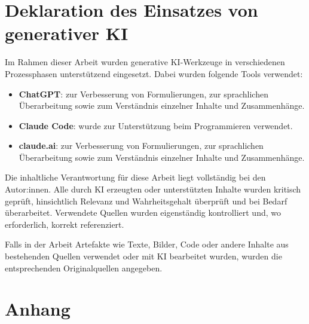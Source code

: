 \documentclass[11pt,a4paper]{article}
\newcounter{includepdfpage}
\begin{document}
	\section*{Deklaration des Einsatzes von generativer KI}
	\begin{minipage}[t]{\textwidth}
		Im Rahmen dieser Arbeit wurden generative KI-Werkzeuge in verschiedenen Prozessphasen unterstützend eingesetzt. Dabei wurden folgende Tools verwendet:
		
		\begin{itemize}
			\item \textbf{ChatGPT}: zur Verbesserung von Formulierungen, zur sprachlichen Überarbeitung sowie zum Verständnis einzelner Inhalte und Zusammenhänge.
			\item \textbf{Claude Code}: wurde zur Unterstützung beim Programmieren verwendet.
			\item \textbf{claude.ai}: zur Verbesserung von Formulierungen, zur sprachlichen Überarbeitung sowie zum Verständnis einzelner Inhalte und Zusammenhänge.
		\end{itemize}
		
		Die inhaltliche Verantwortung für diese Arbeit liegt vollständig bei den Autor:innen. Alle durch KI erzeugten oder unterstützten Inhalte wurden kritisch geprüft, hinsichtlich Relevanz und Wahrheitsgehalt überprüft und bei Bedarf überarbeitet. Verwendete Quellen wurden eigenständig kontrolliert und, wo erforderlich, korrekt referenziert.
		
		Falls in der Arbeit Artefakte wie Texte, Bilder, Code oder andere Inhalte aus bestehenden Quellen verwendet oder mit KI bearbeitet wurden, wurden die entsprechenden Originalquellen angegeben.
	\end{minipage}
	
	
	
	
	\appendix
	\section{Anhang}
	
	\setcounter{includepdfpage}{0}
	
	
	\setcounter{includepdfpage}{0}
	
	
\end{document}
